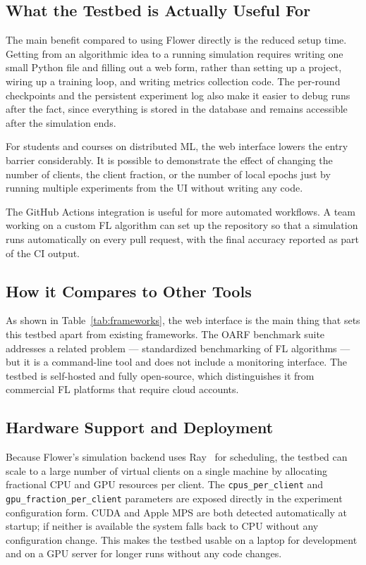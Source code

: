 \documentclass[conference]{IEEEtran}
\begin{document}
\subsection{What the Testbed is Actually Useful For}

The main benefit compared to using Flower directly is the reduced
setup time.
Getting from an algorithmic idea to a running simulation requires
writing one small Python file and filling out a web form, rather than
setting up a project, wiring up a training loop, and writing metrics
collection code.
The per-round checkpoints and the persistent experiment log also make
it easier to debug runs after the fact, since everything is stored in
the database and remains accessible after the simulation ends.

For students and courses on distributed ML, the web interface lowers
the entry barrier considerably.
It is possible to demonstrate the effect of changing the number of
clients, the client fraction, or the number of local epochs just by
running multiple experiments from the UI without writing any code.

The GitHub Actions integration is useful for more automated workflows.
A team working on a custom FL algorithm can set up the repository so
that a simulation runs automatically on every pull request, with the
final accuracy reported as part of the CI output.

\subsection{How it Compares to Other Tools}

As shown in Table~\ref{tab:frameworks}, the web interface is the main
thing that sets this testbed apart from existing frameworks.
The OARF benchmark suite~\cite{hu2022oarf} addresses a related problem
--- standardized benchmarking of FL algorithms --- but it is a
command-line tool and does not include a monitoring interface.
The testbed is self-hosted and fully open-source, which distinguishes
it from commercial FL platforms that require cloud accounts.

\subsection{Hardware Support and Deployment}

Because Flower's simulation backend uses Ray~\cite{moritz2018ray}
for scheduling, the testbed can scale to a large number of virtual
clients on a single machine by allocating fractional CPU and GPU
resources per client.
The \texttt{cpus\_per\_client} and \texttt{gpu\_fraction\_per\_client}
parameters are exposed directly in the experiment configuration form.
CUDA and Apple MPS are both detected automatically at startup; if
neither is available the system falls back to CPU without any
configuration change.
This makes the testbed usable on a laptop for development and on a
GPU server for longer runs without any code changes.
\end{document}
